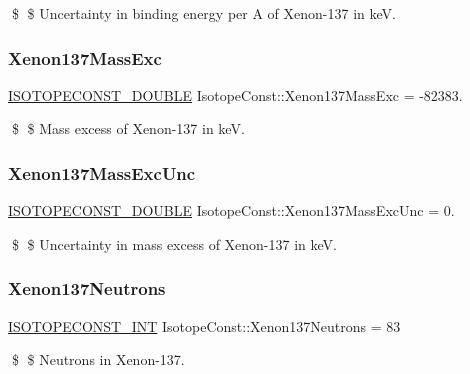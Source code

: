 \$ \$ Uncertainty in binding energy per A of Xenon-\/137 in keV. \mbox{\label{group___isotope_const-_xenon-_xe137_ga75caa72493ea193d4d894f8385b3f900}} 
\subsubsection{\texorpdfstring{Xenon137\+Mass\+Exc}{Xenon137MassExc}}
{\footnotesize\ttfamily \mbox{\hyperlink{group___isotope_const-_macros_ga8f45a7272ce02c0b4c65c44636ed719a}{I\+S\+O\+T\+O\+P\+E\+C\+O\+N\+S\+T\+\_\+\+D\+O\+U\+B\+LE}} Isotope\+Const\+::\+Xenon137\+Mass\+Exc = -\/82383.}

\$ \$ Mass excess of Xenon-\/137 in keV. \mbox{\label{group___isotope_const-_xenon-_xe137_ga7eb6fee9ba819239aed5f3b6da92bbf0}} 
\subsubsection{\texorpdfstring{Xenon137\+Mass\+Exc\+Unc}{Xenon137MassExcUnc}}
{\footnotesize\ttfamily \mbox{\hyperlink{group___isotope_const-_macros_ga8f45a7272ce02c0b4c65c44636ed719a}{I\+S\+O\+T\+O\+P\+E\+C\+O\+N\+S\+T\+\_\+\+D\+O\+U\+B\+LE}} Isotope\+Const\+::\+Xenon137\+Mass\+Exc\+Unc = 0.}

\$ \$ Uncertainty in mass excess of Xenon-\/137 in keV. \mbox{\label{group___isotope_const-_xenon-_xe137_gaabcb9d0585238dd2be9dffeb4aad2932}} 
\subsubsection{\texorpdfstring{Xenon137\+Neutrons}{Xenon137Neutrons}}
{\footnotesize\ttfamily \mbox{\hyperlink{group___isotope_const-_macros_ga5f18360b3e99483a35c32d789e62621c}{I\+S\+O\+T\+O\+P\+E\+C\+O\+N\+S\+T\+\_\+\+I\+NT}} Isotope\+Const\+::\+Xenon137\+Neutrons = 83}

\$ \$ Neutrons in Xenon-\/137. \mbox{\label{group___isotope_const-_xenon-_xe137_ga91b871b6e505468ef5f81992ec737280}} 
